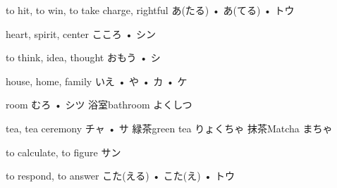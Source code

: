 



\setcounter{cardnum}{33}

		{to hit, to win, to take charge, rightful}
		{あ(たる) • あ(てる) • トウ}
		{}{}
		{}{}
		{}{}
		{}{}
		{}{}

		{heart, spirit, center}
		{こころ • シン}
		{}{}
		{}{}
		{}{}
		{}{}
		{}{}

		{to think, idea, thought}
		{おもう • シ}
		{}{}
		{}{}
		{}{}
		{}{}
		{}{}

		{house, home, family}
		{いえ • や • カ • ケ}
		{}{}
		{}{}
		{}{}
		{}{}
		{}{}

		{room}
		{むろ • シツ}
		{浴室}{bathroom よくしつ}
		{}{}
		{}{}
		{}{}
		{}{}

		{tea, tea ceremony}
		{チャ • サ}
		{緑茶}{green tea りょくちゃ}
		{抹茶}{Matcha まちゃ}
		{}{}
		{}{}
		{}{}

		{to calculate, to figure}
		{サン}
		{}{}
		{}{}
		{}{}
		{}{}
		{}{}

		{to respond, to answer}
		{こた(える) • こた(え) • トウ}
		{}{}
		{}{}
		{}{}
		{}{}
		{}{}

